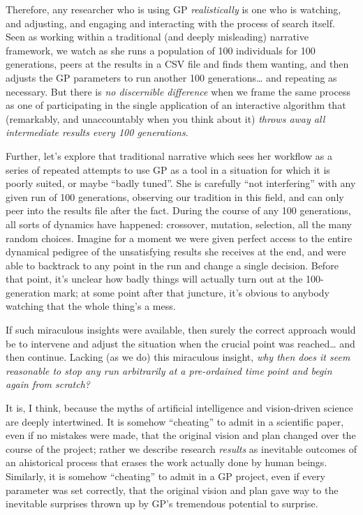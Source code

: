 Therefore, any researcher who is using GP \emph{realistically} is one who is watching, and adjusting, and engaging and interacting with the process of search itself. Seen as working within a traditional (and deeply misleading) narrative framework, we watch as she runs a population of 100 individuals for 100 generations, peers at the results in a CSV file and finds them wanting, and then adjusts the GP parameters to run another 100 generations\ldots{} and repeating as necessary. But there is \emph{no discernible difference} when we frame the same process as one of participating in the single application of an interactive algorithm that (remarkably, and unaccountably when you think about it) \emph{throws away all intermediate results every 100 generations}.

Further, let's explore that traditional narrative which sees her workflow as a series of repeated attempts to use GP as a tool in a situation for which it is poorly suited, or maybe ``badly tuned''. She is carefully ``not interfering'' with any given run of 100 generations, observing our tradition in this field, and can only peer into the results file after the fact. During the course of any 100 generations, all sorts of dynamics have happened: crossover, mutation, selection, all the many random choices. Imagine for a moment we were given perfect access to the entire dynamical pedigree of the unsatisfying results she receives at the end, and were able to backtrack to any point in the run and change a single decision. Before that point, it's unclear how badly things will actually turn out at the 100-generation mark; at some point after that juncture, it's obvious to anybody watching that the whole thing's a mess.

If such miraculous insights were available, then surely the correct approach would be to intervene and adjust the situation when the crucial point was reached\ldots{} and then continue. Lacking (as we do) this miraculous insight, \emph{why then does it seem reasonable to stop any run arbitrarily at a pre-ordained time point and begin again from scratch?}

It is, I think, because the myths of artificial intelligence and vision-driven science are deeply intertwined. It is somehow ``cheating'' to admit in a scientific paper, even if no mistakes were made, that the original vision and plan changed over the course of the project; rather we describe research \emph{results} as inevitable outcomes of an ahistorical process that erases the work actually done by human beings. Similarly, it is somehow ``cheating'' to admit in a GP project, even if every parameter was set correctly, that the original vision and plan gave way to the inevitable surprises thrown up by GP's tremendous potential to surprise.

